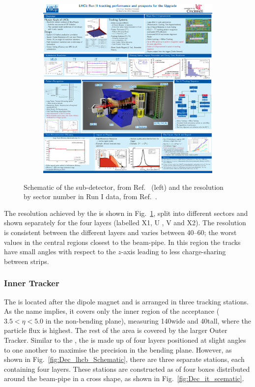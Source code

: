 \begin{figure}[!h]
\begin{subfigure}[m]{0.49\textwidth}
        \includegraphics[width=1.0\textwidth]{figs/Detector/tt_resolution.pdf}
    \end{subfigure}
    \caption{Schematic of the \ttracker sub-detector, from Ref.~\cite{Alves:2008zz} (left) and the \ttracker resolution by sector number in Run I data, from Ref.~\cite{LHCb-DP-2014-002}.}
    \label{fig:Dec_tt_scematic}   
\end{figure}


The resolution achieved by the \ttracker is shown in Fig.~\ref{fig:Dec_tt_scematic}, split into different sectors and shown separately for the four layers (labelled X1, U , V and X2). The resolution is consistent between the different layers and varies between 40--60\mum; the worst values in the central regions closest to the beam-pipe. In this region the tracks have small angles with respect to the $z$-axis leading to less charge-sharing between strips.


\subsubsection{Inner Tracker}

The \intr is located after the dipole magnet and is arranged in three tracking stations. As the name implies, it covers only the inner region of the acceptance ($3.5 < \eta < 5.0$ in the non-bending plane), measuring 140\cm wide and 40\cm tall, where the particle flux is highest. The rest of the area is covered by the larger Outer Tracker. Similar to the \ttracker, the \intr is made up of four layers positioned at slight angles to one another to maximise the precision in the bending plane. However, as shown in Fig.~\ref{fig:Dec_lhcb_Schematic}, there are three separate \intr stations, each containing four layers.
These stations are constructed as of four boxes distributed around the beam-pipe in a cross shape, as shown in Fig.~\ref{fig:Dec_it_scematic}. 




